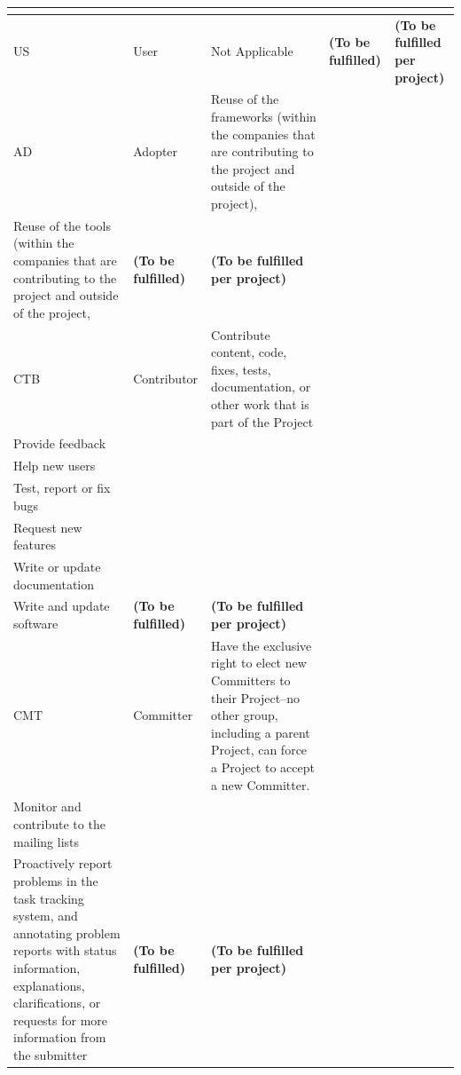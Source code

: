 \documentclass{template/openetcs_article}
\begin{document}
\begin{landscape}
\begin{flushleft}
\begin{supertabular}[H]{|m{1cm}|m{3cm}|m{11cm}|m{4,6cm}|m{4,6cm}|}
\begin{description}
\end{description}
\\\hline
US &
User &
\raggedright
Not Applicable &
\textbf{(To be fulfilled)} &
\textbf{(To be fulfilled per project)} \\\hline
AD &
Adopter &
\raggedright
Reuse of the frameworks (within the companies that are contributing to the project and outside of the project),\\
Reuse of the tools (within the companies that are contributing to the project and outside of the project,
&
\textbf{(To be fulfilled)} &
\textbf{(To be fulfilled per project)} \\\hline
CTB &
Contributor &
\raggedright
Contribute content, code, fixes, tests, documentation, or other work that is part of the Project\\
Provide feedback\\
Help new users\\
Test, report or fix bugs\\
Request new features\\
Write or update documentation\\
Write and update software
&
\textbf{(To be fulfilled)} &
\textbf{(To be fulfilled per project)} \\\hline
CMT &
Committer &
\raggedright
Have the exclusive right to elect new Committers to their Project–no other group, including a parent Project, can force a Project to accept a new Committer.\\
Monitor and contribute to the mailing lists\\
Proactively report problems in the task tracking system, and annotating problem reports with status information, explanations, clarifications, or requests for more information from the submitter
&
\textbf{(To be fulfilled)} &
\textbf{(To be fulfilled per project)} \\\hline
\end{supertabular}
\end{flushleft}


\newpage

\end{landscape}
\end{document}
